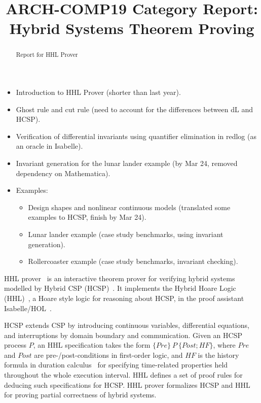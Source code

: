 \documentclass[runningheads,a4paper]{llncs}
\begin{document}
\author{}
\institute{}

\title{ARCH-COMP19 Category Report: Hybrid Systems Theorem Proving}

\maketitle

\begin{abstract}
  Report for HHL Prover
\end{abstract}

\begin{itemize}
\item Introduction to HHL Prover (shorter than last year).



\item Ghost rule and cut rule (need to account for the differences
  between dL and HCSP).
\item Verification of differential invariants using quantifier
  elimination in redlog (as an oracle in Isabelle).
\item Invariant generation for the lunar lander example (by Mar 24,
  removed dependency on Mathematica).
\item Examples:
  \begin{itemize}
  \item Design shapes and nonlinear continuous models (translated some
    examples to HCSP, finish by Mar 24).
  \item Lunar lander example (case study benchmarks, using invariant
    generation).
  \item Rollercoaster example (case study benchmarks, invariant
    checking).
  \end{itemize}
\end{itemize}

HHL prover~\cite{WZZ15} is an interactive theorem prover for verifying
hybrid systems modelled by Hybrid CSP (HCSP)~\cite{He94,ZWR96}. It
implements the Hybrid Hoare Logic (HHL)~\cite{LLQZ10}, a Hoare style
logic for reasoning about HCSP, in the proof assistant
Isabelle/HOL~\cite{isabelle}.

HCSP extends CSP by introducing continuous variables, differential
equations, and interruptions by domain boundary and
communication. Given an HCSP process $P$, an HHL specification takes
the form $\{Pre\}~P~\{Post; HF\}$, where $Pre$ and $Post$ are
pre-/post-conditions in first-order logic, and $HF$ is the history
formula in duration calculus~\cite{ZH04} for specifying time-related
properties held throughout the whole execution interval. HHL defines a
set of proof rules for deducing such specifications for HCSP. HHL
prover formalizes HCSP and HHL for proving partial correctness of
hybrid systems.
\end{document}
